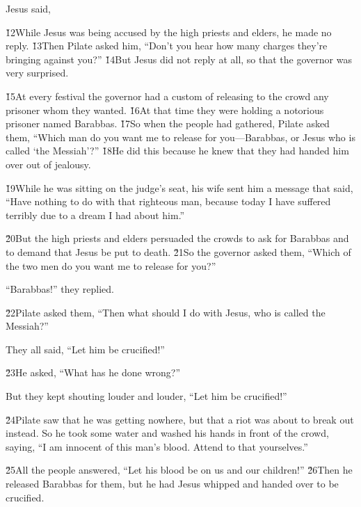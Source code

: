 Jesus said, 

\v{12}While Jesus was being accused by the high priests and elders, he made no reply. \v{13}Then Pilate asked him, ``Don't you hear how many charges they're bringing against you?'' \v{14}But Jesus did not reply at all, so that the governor was very surprised.

\v{15}At every festival the governor had a custom of releasing to the crowd any prisoner whom they wanted. \v{16}At that time they were holding a notorious prisoner named Barabbas. \v{17}So when the people had gathered, Pilate asked them, ``Which man do you want me to release for you---Barabbas, or Jesus who is called `the Messiah'?'' \v{18}He did this because he knew that they had handed him over out of jealousy.

\v{19}While he was sitting on the judge's seat, his wife sent him a message that said, ``Have nothing to do with that righteous man, because today I have suffered terribly due to a dream I had about him.''

\v{20}But the high priests and elders persuaded the crowds to ask for Barabbas and to demand that Jesus be put to death. \v{21}So the governor asked them, ``Which of the two men do you want me to release for you?''

``Barabbas!'' they replied.

\v{22}Pilate asked them, ``Then what should I do with Jesus, who is called the Messiah?''

They all said, ``Let him be crucified!''

\v{23}He asked, ``What has he done wrong?''

But they kept shouting louder and louder, ``Let him be crucified!''

\v{24}Pilate saw that he was getting nowhere, but that a riot was about to break out instead. So he took some water and washed his hands in front of the crowd, saying, ``I am innocent of this man's blood. Attend to that yourselves.''

\v{25}All the people answered, ``Let his blood be on us and our children!'' \v{26}Then he released Barabbas for them, but he had Jesus whipped and handed over to be crucified.

